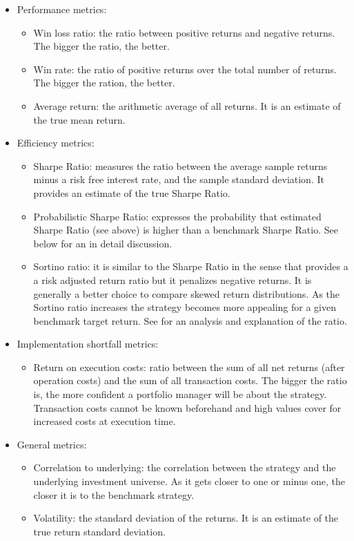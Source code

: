 \begin{itemize}
  \item Performance metrics:
  \begin{itemize}
    \item Win loss ratio: the ratio between positive returns and negative returns.
          The bigger the ratio, the better.
    \item Win rate: the ratio of positive returns over the total number of
          returns. The bigger the ration, the better.
    \item Average return: the arithmetic average of all returns. It is an estimate of the
          true mean return.
  \end{itemize}
  \item Efficiency metrics:
  \begin{itemize}
    \item Sharpe Ratio: measures the ratio between the average sample returns minus a risk free interest rate\footnotemark, and
          the sample standard deviation. It provides an estimate of the true
          Sharpe Ratio.
    \item Probabilistic Sharpe Ratio: expresses the probability that estimated
          Sharpe Ratio (see above) is higher than a benchmark Sharpe Ratio. See
          below for an in detail discussion.
    \item Sortino ratio: it is similar to the Sharpe Ratio in the sense that provides a
          a risk adjusted return ratio but it penalizes negative returns. It is
          generally a better choice to compare skewed return distributions. As the
          Sortino ratio increases the strategy becomes more appealing for a given
          benchmark target return. See \cite{sortino_a_sharper_ratio} for an
          analysis and explanation of the ratio.
  \end{itemize}
  \item Implementation shortfall metrics:
  \begin{itemize}
    \item Return on execution costs: ratio between the sum of all net returns
          (after operation costs) and the sum of all transaction costs. The bigger
          the ratio is, the more confident a portfolio manager will be about the
          strategy. Transaction costs cannot be known beforehand and high values
          cover for increased costs at execution time.
  \end{itemize}
  \item General metrics:
  \begin{itemize}
    \item Correlation to underlying: the correlation between the strategy and the
          underlying investment universe. As it gets closer to one or minus one,
          the closer it is to the benchmark strategy.
    \item Volatility: the standard deviation of the returns. It is an estimate of
          the true return standard deviation.
  \end{itemize}
\end{itemize} 

